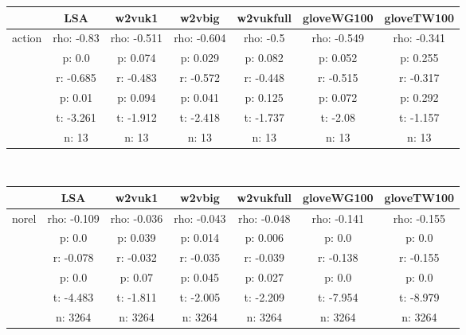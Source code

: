 \documentclass{article}
\begin{document}
\begin{tabular}{ccccccc|}\cline{2-7}
&\multicolumn{1}{|c}{LSA} & w2vuk1 & w2vbig & w2vukfull & gloveWG100 & gloveTW100 \\\hline
\multicolumn{1}{|c|}{\multirow{6}{*}{action}} & rho: -0.83 & rho: -0.511 & rho: -0.604 & rho: -0.5 & rho: -0.549 & rho: -0.341 \\
\multicolumn{1}{|c|}{} & p: 0.0 & p: 0.074 & p: 0.029 & p: 0.082 & p: 0.052 & p: 0.255 \\
\multicolumn{1}{|c|}{} & r: -0.685 & r: -0.483 & r: -0.572 & r: -0.448 & r: -0.515 & r: -0.317 \\
\multicolumn{1}{|c|}{} & p: 0.01 & p: 0.094 & p: 0.041 & p: 0.125 & p: 0.072 & p: 0.292 \\
\multicolumn{1}{|c|}{} & t: -3.261 & t: -1.912 & t: -2.418 & t: -1.737 & t: -2.08 & t: -1.157 \\
\multicolumn{1}{|c|}{} & n: 13 & n: 13 & n: 13 & n: 13 & n: 13 & n: 13 \\
\hline
\end{tabular}\\
\begin{tabular}{ccccccc|}\cline{2-7}
&\multicolumn{1}{|c}{LSA} & w2vuk1 & w2vbig & w2vukfull & gloveWG100 & gloveTW100 \\\hline
\multicolumn{1}{|c|}{\multirow{6}{*}{norel}} & rho: -0.109 & rho: -0.036 & rho: -0.043 & rho: -0.048 & rho: -0.141 & rho: -0.155 \\
\multicolumn{1}{|c|}{} & p: 0.0 & p: 0.039 & p: 0.014 & p: 0.006 & p: 0.0 & p: 0.0 \\
\multicolumn{1}{|c|}{} & r: -0.078 & r: -0.032 & r: -0.035 & r: -0.039 & r: -0.138 & r: -0.155 \\
\multicolumn{1}{|c|}{} & p: 0.0 & p: 0.07 & p: 0.045 & p: 0.027 & p: 0.0 & p: 0.0 \\
\multicolumn{1}{|c|}{} & t: -4.483 & t: -1.811 & t: -2.005 & t: -2.209 & t: -7.954 & t: -8.979 \\
\multicolumn{1}{|c|}{} & n: 3264 & n: 3264 & n: 3264 & n: 3264 & n: 3264 & n: 3264 \\
\hline
\end{tabular}\\
\end{document}
